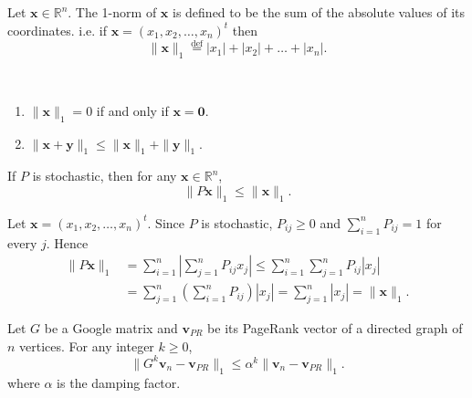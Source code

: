 \begin{definition}
Let $\mathbf{x}\in\mathbb{R}^n$. The 1-norm of $\mathbf{x}$ is defined to be the sum of the absolute values of its coordinates. i.e. if $\mathbf{x}=(x_1,x_2,\dots,x_n)^t$ then
\[
\|\mathbf{x}\|_1
\overset{\mathrm{def}}{=}
|x_1|+|x_2|+\dots+|x_n|.
\]
\end{definition}

\begin{remark}\ \vspace{-2em}
\begin{enumerate}
    \item $\|\mathbf{x}\|_1=0$ if and only if $\mathbf{x}=\mathbf{0}$.
    \item $\|\mathbf{x}+\mathbf{y}\|_1\le \|\mathbf{x}\|_1+\|\mathbf{y}\|_1$.
\end{enumerate} 
\end{remark}



\begin{lemma}
If $P$ is stochastic, then for any $\mathbf{x}\in\mathbb{R}^n$,
\begin{equation}
\label{eq:stochastic-l1-contraction}
\|P\mathbf{x}\|_1
\le
\|\mathbf{x}\|_1.
\end{equation}
\end{lemma}

\begin{pfbox}
Let $\mathbf{x}=(x_1,x_2,\dots,x_n)^t$. Since $P$ is stochastic, $P_{ij}\ge0$ and $\displaystyle\sum_{i=1}^n P_{ij}=1$ for every $j$. Hence
\[
\begin{aligned}
\|P\mathbf{x}\|_1
&=
\sum_{i=1}^n\left|\sum_{j=1}^n P_{ij}x_j\right|
\le
\sum_{i=1}^n\sum_{j=1}^n P_{ij}|x_j|\\
&=
\sum_{j=1}^n\left(\sum_{i=1}^n P_{ij}\right)|x_j|
=
\sum_{j=1}^n |x_j|
=
\|\mathbf{x}\|_1.
\end{aligned}
\]
\end{pfbox}

\begin{theorem}
Let $G$ be a Google matrix and $\mathbf{v}_{PR}$ be its PageRank vector of a directed graph of $n$ vertices. For any integer $k\ge0$,
\begin{equation}
\label{eq:google-power-iteration-bound}
\|G^k\mathbf{v}_n-\mathbf{v}_{PR}\|_1
\le
\alpha^k\|\mathbf{v}_n-\mathbf{v}_{PR}\|_1.
\end{equation}
where $\alpha$ is the damping factor.
\end{theorem}


